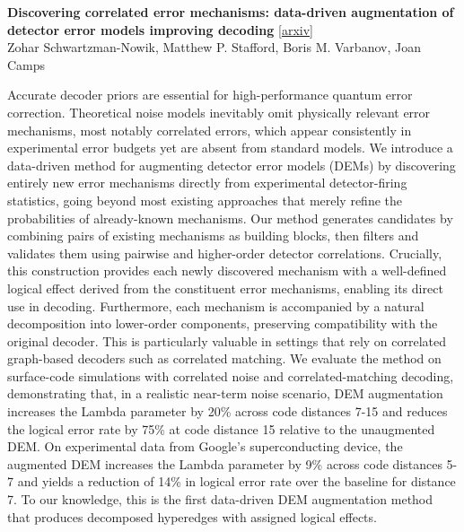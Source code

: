 \documentclass[12pt,letterpaper]{article}
\begin{document}
{\small\textbf{Discovering correlated error mechanisms: data-driven augmentation of detector error models improving decoding}} {\scriptsize[\href{https://arxiv.org/abs/2611.06605}{arxiv}]}\nopagebreak\\
{\scriptsize Zohar Schwartzman-Nowik, Matthew P. Stafford, Boris M. Varbanov, Joan Camps}\nopagebreak\\[2pt]
{\footnotesize Accurate decoder priors are essential for high-performance quantum error correction. Theoretical noise models inevitably omit physically relevant error mechanisms, most notably correlated errors, which appear consistently in experimental error budgets yet are absent from standard models. We introduce a data-driven method for augmenting detector error models (DEMs) by discovering entirely new error mechanisms directly from experimental detector-firing statistics, going beyond most existing approaches that merely refine the probabilities of already-known mechanisms. Our method generates candidates by combining pairs of existing mechanisms as building blocks, then filters and validates them using pairwise and higher-order detector correlations. Crucially, this construction provides each newly discovered mechanism with a well-defined logical effect derived from the constituent error mechanisms, enabling its direct use in decoding. Furthermore, each mechanism is accompanied by a natural decomposition into lower-order components, preserving compatibility with the original decoder. This is particularly valuable in settings that rely on correlated graph-based decoders such as correlated matching. We evaluate the method on surface-code simulations with correlated noise and correlated-matching decoding, demonstrating that, in a realistic near-term noise scenario, DEM augmentation increases the Lambda parameter by 20\% across code distances 7-15 and reduces the logical error rate by 75\% at code distance 15 relative to the unaugmented DEM. On experimental data from Google's superconducting device, the augmented DEM increases the Lambda parameter by 9\% across code distances 5-7 and yields a reduction of 14\% in logical error rate over the baseline for distance 7. To our knowledge, this is the first data-driven DEM augmentation method that produces decomposed hyperedges with assigned logical effects.\par}
\medskip
\end{document}
